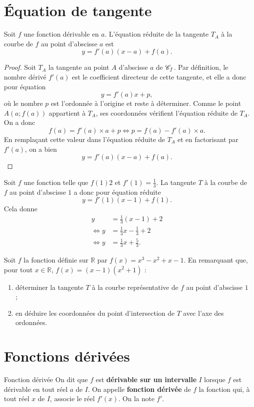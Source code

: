\documentclass[11pt]{article}
\begin{document}
\section{Équation de tangente}
\begin{prop}
  Soit $f$ une fonction dérivable en $a$. L'équation réduite de la tangente
  $T_A$ à la courbe de $f$ au point d'abscisse $a$ est
  \[
    y = f'(a)(x-a)+f(a).
  \]
\end{prop}
\begin{proof}
  Soit $T_A$ la tangente au point $A$ d'abscisse $a$ de $\mathscr{C}_f$. Par définition,
  le nombre dérivé $f'(a)$ est le coefficient directeur de cette tangente, et
  elle a donc pour équation
  \[
    y = f'(a)x + p,
  \]
  où le nombre $p$ est l'ordonnée à l'origine et reste à déterminer. Comme le
  point $A(a; f(a))$ appartient à $T_A$, ses coordonnées vérifient l'équation
  réduite de $T_A$. On a donc
  \[
    f(a) = f'(a)\times a+p\Longleftrightarrow p=f(a)-f'(a)\times
  a.
  \]
En remplaçant cette valeur dans l'équation réduite de $T_A$ et en
  factorisant par $f'(a)$, on a bien
  \[
    y = f'(a)(x-a)+f(a).
  \]
\end{proof}
\begin{exemple}
  Soit $f$ une fonction telle que $f(1)2$ et $f'(1)=\frac{1}{3}$. La tangente
  $T$ à la courbe de $f$ au point d'abscisse $1$ a donc pour équation réduite
  \[
    y = f'(1)(x-1)+f(1).
  \]
  Cela donne
  \begin{align*}
   y &= \frac{1}{3}(x-1)+2 \\
    \Leftrightarrow y &= \frac{1}{3}x-\frac{1}{3}+2 \\
    \Leftrightarrow y &= \frac{1}{3}x+\frac{5}{3}.
  \end{align*}
\end{exemple}
\begin{app}
  Soit $f$ la fonction définie sur $\mathbb{R}$ par $f(x) = x^3-x^2+x-1$. En
  remarquant que, pour tout $x\in\mathbb{R}$, $f(x)=(x-1)(x^2+1)$ :
  \begin{enumerate}
    \item déterminer la tangente $T$ à la courbe représentative de $f$ au point
      d'abscisse $1$;
    \item en déduire les coordonnées du point d'intersection de $T$ avec l'axe
      des ordonnées.
  \end{enumerate}
\end{app}

\section{Fonctions dérivées}
\begin{defi}{Fonction dérivée}
  On dit que $f$ est \textbf{dérivable sur un intervalle} $I$ lorsque $f$ est
  dérivable en tout réel $a$ de $I$. On appelle \textbf{fonction dérivée} de $f$
  la fonction qui, à tout réel $x$ de $I$, associe le réel $f'(x)$. On la note
  $f'$.
\end{defi}
\end{document}
